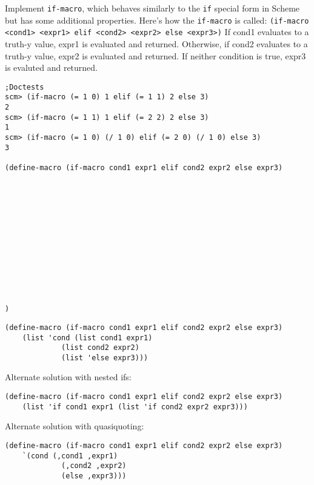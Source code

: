 \begin{blocksection}

\question Implement \texttt{if-macro}, which behaves similarly to the \texttt{if} special form in Scheme
but has some additional properties. Here's how the \texttt{if-macro} is called:
\newline
\texttt{(if-macro <cond1> <expr1> elif <cond2> <expr2> else <expr3>)}
\newline
If cond1 evaluates to a truth-y value, expr1 is evaluated and returned. Otherwise, if cond2 evaluates
to a truth-y value, expr2 is evaluated and returned. If neither condition is true, expr3 is evaluted and returned.

\begin{lstlisting}
;Doctests
scm> (if-macro (= 1 0) 1 elif (= 1 1) 2 else 3)
2
scm> (if-macro (= 1 1) 1 elif (= 2 2) 2 else 3)
1
scm> (if-macro (= 1 0) (/ 1 0) elif (= 2 0) (/ 1 0) else 3)
3

(define-macro (if-macro cond1 expr1 elif cond2 expr2 else expr3)













)
\end{lstlisting}
\end{blocksection}
\begin{blocksection}
\begin{solution}[0.5in]
\begin{lstlisting}
(define-macro (if-macro cond1 expr1 elif cond2 expr2 else expr3)
    (list 'cond (list cond1 expr1)
             (list cond2 expr2)
             (list 'else expr3)))
\end{lstlisting}
Alternate solution with nested ifs:
\begin{lstlisting}
(define-macro (if-macro cond1 expr1 elif cond2 expr2 else expr3)
    (list 'if cond1 expr1 (list 'if cond2 expr2 expr3)))
\end{lstlisting}
Alternate solution with quasiquoting:
\begin{lstlisting}
(define-macro (if-macro cond1 expr1 elif cond2 expr2 else expr3)
    `(cond (,cond1 ,expr1)
             (,cond2 ,expr2)
             (else ,expr3)))
\end{lstlisting}
\end{solution}

\end{blocksection}

